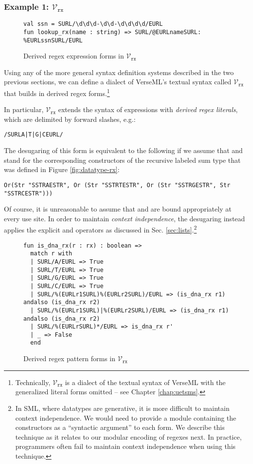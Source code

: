 \subsubsection{Example 1: $\mathcal{V}_\texttt{rx}$}
\begin{figure}
\begin{lstlisting}[numbers=none]
val ssn = SURL/\d\d\d-\d\d-\d\d\d\d/EURL
fun lookup_rx(name : string) => SURL/@EURLnameSURL: %EURLssnSURL/EURL
\end{lstlisting}
\caption{Derived regex expression forms in $\mathcal{V}_\texttt{rx}$}
\label{fig:derived-spliced-subexpressions}
\end{figure}
Using any of the more general syntax definition systems described in the two previous sections, we can define a dialect of VerseML's textual syntax called  $\mathcal{V}_\texttt{rx}$ that builds in derived regex forms.\footnote{Technically, $\mathcal{V}_\texttt{rx}$ is a dialect of the textual syntax of VerseML with the generalized literal forms omitted -- see Chapter \ref{chap:uetsms}.} 

In particular, $\mathcal{V}_\texttt{rx}$ extends the syntax of expressions with  \emph{derived regex literals}, which are delimited by forward slashes, e.g.:
\begin{lstlisting}[numbers=none]
/SURLA|T|G|CEURL/
\end{lstlisting}
The desugaring of this form is equivalent to the following if we assume that  and  stand for the corresponding constructors of the recursive labeled sum type  that was defined in Figure \ref{fig:datatype-rx}:
\begin{lstlisting}[numbers=none]
Or(Str "SSTRAESTR", Or (Str "SSTRTESTR", Or (Str "SSTRGESTR", Str "SSTRCESTR")))
\end{lstlisting}
Of course, it is unreasonable to assume that  and  are bound appropriately at every use site. In order to maintain \emph{context independence}, the desugaring instead applies the explicit  and  operators as discussed in Sec. \ref{sec:lists}.\footnote{In SML, where datatypes are generative, it is more difficult to maintain context independence. We would need to provide a module containing the constructors as a ``syntactic argument'' to each form. We describe this technique as it relates to our modular encoding of regexes next. In practice, programmers often fail to maintain context independence when using this technique.}

\begin{figure}
\begin{lstlisting}[numbers=none]
fun is_dna_rx(r : rx) : boolean => 
  match r with 
  | SURL/A/EURL => True
  | SURL/T/EURL => True
  | SURL/G/EURL => True
  | SURL/C/EURL => True
  | SURL/%(EURLr1SURL)%(EURLr2SURL)/EURL => (is_dna_rx r1) andalso (is_dna_rx r2)
  | SURL/%(EURLr1SURL)|%(EURLr2SURL)/EURL => (is_dna_rx r1) andalso (is_dna_rx r2)
  | SURL/%(EURLrSURL)*/EURL => is_dna_rx r'
  | _ => False
  end
\end{lstlisting}
\vspace{-5px}
\caption{Derived regex pattern forms in $\mathcal{V}_\texttt{rx}$}
\label{fig:derived-pattern-syntax}
\end{figure}

